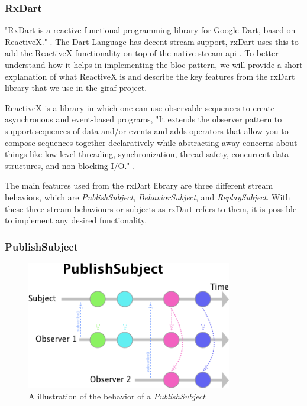 \subsubsection{RxDart}

"RxDart is a reactive functional programming library for Google Dart, based on ReactiveX." \cite{rxDart}. The Dart Language has decent stream support, rxDart uses this to add the ReactiveX functionality on top of the native stream \gls{api} \cite{rxDart}. To better understand how it helps in implementing the \gls{bloc} pattern, we will provide a short explanation of what ReactiveX is and describe the key features from the rxDart library that we use in the \gls{giraf} project.

ReactiveX is a library in which one can use observable sequences to create asynchronous and event-based programs, "It extends the observer pattern to support sequences of data and/or events and adds operators that allow you to compose sequences together declaratively while abstracting away concerns about things like low-level threading, synchronization, thread-safety, concurrent data structures, and non-blocking I/O." \cite{ReactiveXWebsite}.

The main features used from the rxDart library are three different stream behaviors, which are \textit{PublishSubject}, \textit{BehaviorSubject}, and \textit{ReplaySubject}. With these three stream behaviours or subjects as rxDart refers to them, it is possible to implement any desired functionality.

\subsubsection{PublishSubject}

\begin{figure}[h]
    \centering
    \includegraphics[width=0.8\textwidth]{figures/PublishSubject.png}
    \caption{A illustration of the behavior of a \textit{PublishSubject}}
    \label{fig:PublishSubject}
\end{figure}

